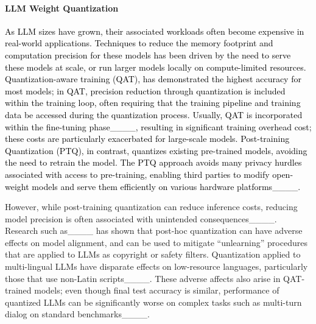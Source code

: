 \paragraph{LLM Weight Quantization} 
\textcolor{black}{As LLM sizes have grown, their associated workloads often become expensive in real-world applications. Techniques to reduce the memory footprint and computation precision for these models has been driven by the need to serve these models at scale, or run larger models locally on compute-limited resources. Quantization-aware training (QAT), has demonstrated the highest accuracy for most models; in QAT, precision reduction through quantization is included within the training loop, often requiring that the training pipeline and training data be accessed during the quantization process. Usually, QAT is incorporated within the fine-tuning phase____, resulting in significant training overhead cost; these costs are particularly exacerbated for large-scale models. Post-training Quantization (PTQ), in contrast, quantizes existing pre-trained models, avoiding the need to retrain the model. The PTQ approach avoids many privacy hurdles associated with access to pre-training, enabling third parties to modify open-weight models and serve them efficiently on various hardware platforms____.}


However, while post-training quantization can reduce inference costs, reducing model precision is often associated with unintended consequences____. Research such as____ has shown that post-hoc quantization can have adverse effects on model alignment, and can be used to mitigate ``unlearning'' procedures that are applied to LLMs as copyright or safety filters. Quantization applied to multi-lingual LLMs have disparate effects on low-resource languages, particularly those that use non-Latin scripts____. These adverse affects also arise in QAT-trained models; even though final test accuracy is similar, performance of quantized LLMs can be significantly worse on complex tasks such as multi-turn dialog on standard benchmarks____.   


